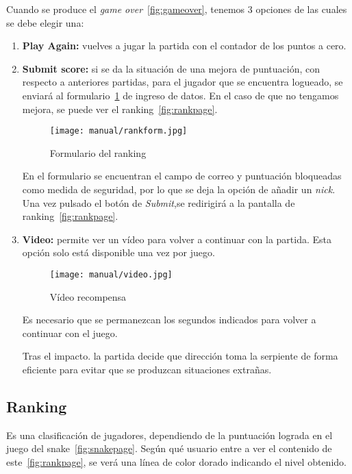 Cuando se produce el \emph{game over}~\ref{fig:gameover}, tenemos 3 opciones de las cuales se debe elegir una:

\begin{enumerate}
	\item \textbf{Play Again:} vuelves a jugar la partida con el contador de los puntos a cero.
	\item \textbf{Submit score:} si se da la situación de una mejora de puntuación, con respecto a anteriores partidas, para el jugador que se encuentra logueado, se enviará al formulario~\ref{fig:rankform} de ingreso de datos.
	En el caso de que no tengamos mejora, se puede ver el ranking~\ref{fig:rankpage}.
	
	\begin{figure}[H]
		\centering
		\texttt{[image: manual/rankform.jpg]}
		\caption{Formulario del ranking}\label{fig:rankform}
	\end{figure}
	
	En el formulario se encuentran el campo de correo y puntuación bloqueadas como medida de seguridad, por lo que se deja la opción de añadir un \emph{nick}. Una vez pulsado el botón de \emph{Submit},se redirigirá a la pantalla de ranking~\ref{fig:rankpage}.
	
	\item \textbf{Video:} permite ver un vídeo para volver a continuar con la partida. Esta opción solo está disponible una vez por juego.
	
		\begin{figure}[H]
		\centering
		\texttt{[image: manual/video.jpg]}
		\caption{Vídeo recompensa}\label{fig:video}
		\end{figure}
	
	Es necesario que se permanezcan los segundos indicados para volver a continuar con el juego. 
	
	Tras el impacto. la partida decide que dirección toma la serpiente de forma eficiente para evitar que se produzcan situaciones extrañas.
		
\end{enumerate}

\subsection{Ranking}\label{rank}
Es una clasificación de jugadores, dependiendo de la puntuación lograda en el juego del snake~\ref{fig:snakepage}. Según qué usuario entre a ver el contenido de este~\ref{fig:rankpage}, se verá una línea de color dorado indicando el nivel obtenido.

